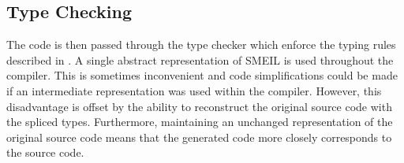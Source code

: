 


\subsection{Type Checking} The code is then passed through the type checker
which enforce the typing rules described in . A single
abstract representation of SMEIL is used throughout the compiler. This is
sometimes inconvenient and code simplifications could be made if an intermediate
representation was used within the compiler. However, this disadvantage is
offset by the ability to reconstruct the original source code with the spliced
types. Furthermore, maintaining an unchanged representation of the original
source code means that the generated code more closely corresponds to the source
code.

